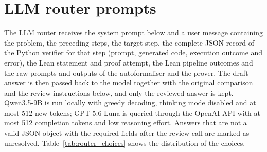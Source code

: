 \section{LLM router prompts}
\label{app:prompts}
The LLM router receives the system prompt below and a user message containing the problem, the preceding steps, the target step, the complete JSON record of the Python verifier for that step (prompt, generated code, execution outcome and error), the Lean statement and proof attempt, the Lean pipeline outcomes and the raw prompts and outputs of the autoformaliser and the prover. The draft answer is then passed back to the model together with the original comparison and the review instructions below, and only the reviewed answer is kept. Qwen3.5-9B is run locally with greedy decoding, thinking mode disabled and at most 512 new tokens; GPT-5.6 Luna is queried through the OpenAI API with at most 512 completion tokens and low reasoning effort. Answers that are not a valid JSON object with the required fields after the review call are marked as unresolved. Table~\ref{tab:router_choices} shows the distribution of the choices.



